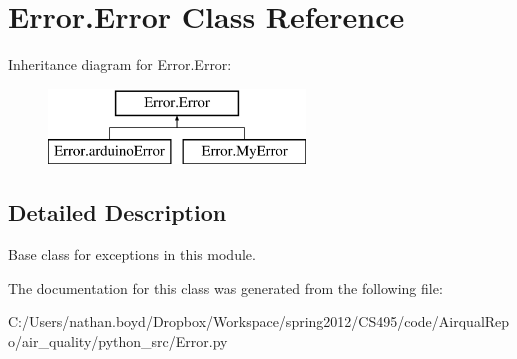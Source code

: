 \hypertarget{class_error_1_1_error}{\section{Error.\-Error Class Reference}
\label{class_error_1_1_error}
}
Inheritance diagram for Error.\-Error\-:\begin{figure}[H]
\begin{center}
\leavevmode
\includegraphics[height=2.000000cm]{class_error_1_1_error}
\end{center}
\end{figure}


\subsection{Detailed Description}
\begin{DoxyVerb}Base class for exceptions in this module.\end{DoxyVerb}
 

The documentation for this class was generated from the following file\-:\begin{DoxyCompactItemize}
\item 
C\-:/\-Users/nathan.\-boyd/\-Dropbox/\-Workspace/spring2012/\-C\-S495/code/\-Airqual\-Repo/air\-\_\-quality/python\-\_\-src/Error.\-py\end{DoxyCompactItemize}
